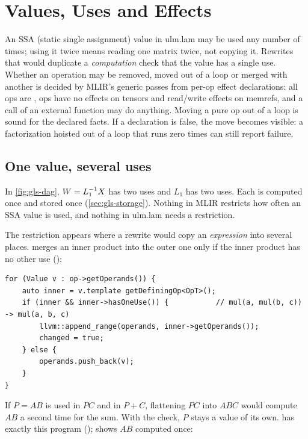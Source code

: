 \chapter{Values, Uses and Effects}
\label{ch:values}

\begin{answer}
An SSA (static single assignment) value in ulm.lam may be used any number
of times; using it twice means reading one matrix twice, not copying it.
Rewrites that would duplicate a \emph{computation} check that the value
has a single use. Whether an operation may be removed, moved out of a loop or
merged with another is decided by MLIR's generic passes from per-op effect
declarations: all  ops are ,  ops
have no effects on tensors and read/write effects on memrefs, and a call of
an external function may do anything. Moving a pure op out of a loop is
sound for the declared facts. If a declaration is false, the move becomes
visible: a factorization hoisted out of a loop that runs zero times can
still report failure.
\end{answer}

\section{One value, several uses}
\label{sec:values-uses}

In \cref{fig:gls-dag}, \(W = L_1^{-1} X\) has two uses and \(L_1\) has two
uses. Each is computed once and stored once (\cref{sec:gls-storage}).
Nothing in MLIR restricts how often an SSA value is used, and nothing in
ulm.lam needs a restriction.

The restriction appears where a rewrite would copy an \emph{expression}
into several places.  merges an inner product into the outer
one only if the inner product has no other use
():

\begin{lstlisting}[style=cpp]
for (Value v : op->getOperands()) {
    auto inner = v.template getDefiningOp<OpT>();
    if (inner && inner->hasOneUse()) {           // mul(a, mul(b, c)) -> mul(a, b, c)
        llvm::append_range(operands, inner->getOperands());
        changed = true;
    } else {
        operands.push_back(v);
    }
}
\end{lstlisting}

If \(P = AB\) is used in \(PC\) and in \(P + C\), flattening \(PC\) into
\(ABC\) would compute \(AB\) a second time for the sum. With the check,
\(P\) stays a value of its own.  has exactly
this program ();  shows \(AB\) computed once:

